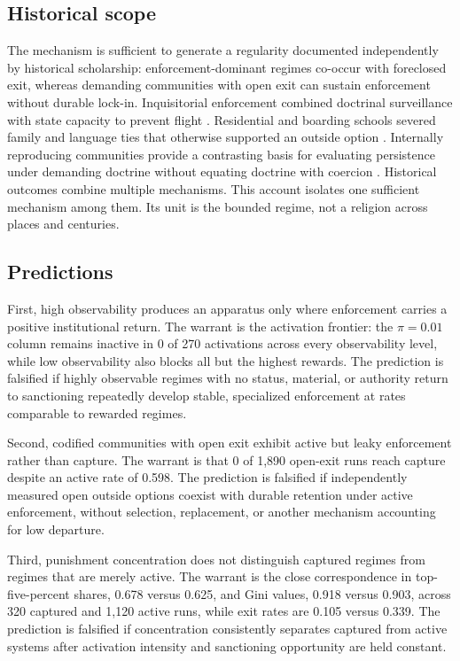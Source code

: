 \documentclass[12pt]{article}
\begin{document}
\subsection{Historical scope}

The mechanism is sufficient to generate a regularity documented independently by historical scholarship:
enforcement-dominant regimes co-occur with foreclosed exit, whereas demanding communities with open exit can sustain
enforcement without durable lock-in. Inquisitorial enforcement combined doctrinal surveillance with state capacity to
prevent flight \citep{given1997}. Residential and
boarding schools severed family and language ties that otherwise supported an outside option \citep{adams1995}. Internally
reproducing communities provide a contrasting basis for evaluating persistence under demanding doctrine without equating
doctrine with coercion \citep{hostetler1974}.
Historical outcomes combine multiple mechanisms. This account isolates one sufficient mechanism among them. Its unit is
the bounded regime, not a religion across places and centuries.

\subsection{Predictions}

First, high observability produces an apparatus only where enforcement carries a positive institutional return. The
warrant is the activation frontier: the \(\pi=0.01\) column remains inactive in 0 of 270 activations across every
observability level, while low observability also blocks all but the highest rewards. The prediction is falsified if
highly observable regimes with no status, material, or authority return to sanctioning repeatedly develop stable,
specialized enforcement at rates comparable to rewarded regimes.

Second, codified communities with open exit exhibit active but leaky enforcement rather than capture. The warrant is
that 0 of 1,890 open-exit runs reach capture despite an active rate of 0.598. The prediction is falsified if
independently measured open outside options coexist with durable retention under active enforcement, without selection,
replacement, or another mechanism accounting for low departure.

Third, punishment concentration does not distinguish captured regimes from regimes that are merely active. The warrant
is the close correspondence in top-five-percent shares, 0.678 versus 0.625, and Gini values, 0.918 versus 0.903, across
320 captured and 1,120 active runs, while exit rates are 0.105 versus 0.339. The prediction is falsified if
concentration consistently separates captured from active systems after activation intensity and sanctioning opportunity
are held constant.
\end{document}
